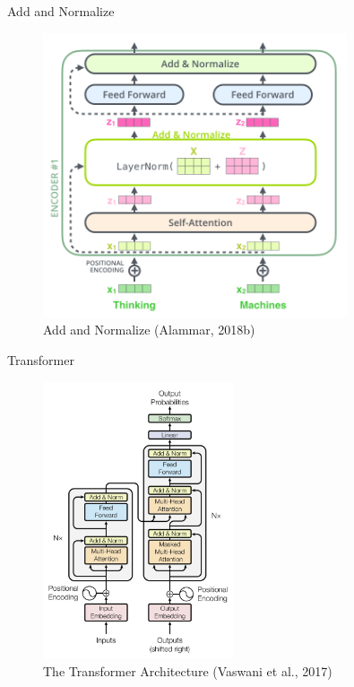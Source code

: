 \documentclass[10pt]{beamer}
\begin{document}
\begin{frame}{Add and Normalize}

\begin{figure}[h]
\centering
\includegraphics[width=0.8\textwidth]{fig/alammar_transformer_resideual_layer_norm_2.png}
\caption{Add and Normalize (Alammar, 2018b)}
\end{figure}

\end{frame}



\begin{frame}{Transformer}

\begin{figure}[h]
\centering
\includegraphics[width=0.5\textwidth]{fig/Vaswani_1_transformer.png}
\caption{The Transformer Architecture (Vaswani et al., 2017)}
\end{figure}

\end{frame}
\end{document}
